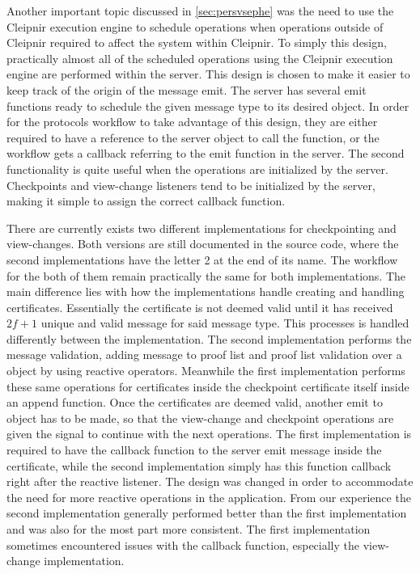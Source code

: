 Another important topic discussed in \autoref{sec:persvsephe} was the need to use the Cleipnir execution engine to schedule operations when operations outside of Cleipnir required to affect the system within Cleipnir. To simply this design, practically almost all of the scheduled operations using the Cleipnir execution engine are performed within the server. This design is chosen to make it easier to keep track of the origin of the message emit. The server has several emit functions ready to schedule the given message type to its desired  object. In order for the protocols workflow to take advantage of this design, they are either required to have a reference to the server object to call the function, or the workflow gets a callback referring to the emit function in the server. The second functionality is quite useful when the operations are initialized by the server. Checkpoints and view-change listeners tend to be initialized by the server, making it simple to assign the correct callback function.

There are currently exists two different implementations for checkpointing and view-changes. Both versions are still documented in the source code, where the second implementations have the letter 2 at the end of its name. The workflow for the both of them remain practically the same for both implementations. The main difference lies with how the implementations handle creating and handling certificates. Essentially the certificate is not deemed valid until it has received $2f+1$ unique and valid message for said message type. This processes is handled differently between the implementation. The second implementation performs the message validation, adding message to proof list and proof list validation over a  object by using reactive operators. Meanwhile the first implementation performs these same operations for certificates inside the checkpoint certificate itself inside an append function. Once the certificates are deemed valid, another emit to  object has to be made, so that the view-change and checkpoint operations are given the signal to continue with the next operations. The first implementation is required to have the callback function to the server emit message inside the certificate, while the second implementation simply has this function callback right after the reactive listener. The design was changed in order to accommodate the need for more reactive operations in the application. From our experience the second implementation generally performed better than the first implementation and was also for the most part more consistent. The first implementation sometimes encountered issues with the callback function, especially the view-change implementation.

